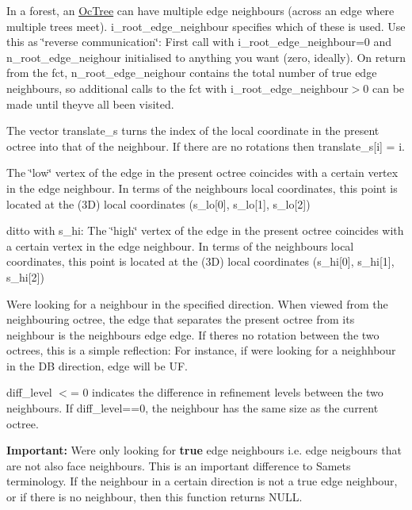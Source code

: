 \begin{DoxyItemize}
\item In a forest, an \hyperlink{classoomph_1_1OcTree}{Oc\+Tree} can have multiple edge neighbours (across an edge where multiple trees meet). {\ttfamily i\+\_\+root\+\_\+edge\+\_\+neighbour} specifies which of these is used. Use this as \char`\"{}reverse communication\char`\"{}\+: First call with {\ttfamily i\+\_\+root\+\_\+edge\+\_\+neighbour=0} and {\ttfamily n\+\_\+root\+\_\+edge\+\_\+neighour} initialised to anything you want (zero, ideally). On return from the fct, {\ttfamily n\+\_\+root\+\_\+edge\+\_\+neighour} contains the total number of true edge neighbours, so additional calls to the fct with {\ttfamily i\+\_\+root\+\_\+edge\+\_\+neighbour$>$0} can be made until they\textquotesingle{}ve all been visited.
\item The vector {\ttfamily translate\+\_\+s} turns the index of the local coordinate in the present octree into that of the neighbour. If there are no rotations then {\ttfamily translate\+\_\+s}\mbox{[}i\mbox{]} = i.
\item The \char`\"{}low\char`\"{} vertex of the edge in the present octree coincides with a certain vertex in the edge neighbour. In terms of the neighbour\textquotesingle{}s local coordinates, this point is located at the (3D) local coordinates ({\ttfamily s\+\_\+lo}\mbox{[}0\mbox{]}, {\ttfamily s\+\_\+lo}\mbox{[}1\mbox{]}, {\ttfamily s\+\_\+lo}\mbox{[}2\mbox{]})
\item ditto with s\+\_\+hi\+: The \char`\"{}high\char`\"{} vertex of the edge in the present octree coincides with a certain vertex in the edge neighbour. In terms of the neighbour\textquotesingle{}s local coordinates, this point is located at the (3D) local coordinates ({\ttfamily s\+\_\+hi}\mbox{[}0\mbox{]}, {\ttfamily s\+\_\+hi}\mbox{[}1\mbox{]}, {\ttfamily s\+\_\+hi}\mbox{[}2\mbox{]})
\item We\textquotesingle{}re looking for a neighbour in the specified {\ttfamily direction}. When viewed from the neighbouring octree, the edge that separates the present octree from its neighbour is the neighbour\textquotesingle{}s edge {\ttfamily edge}. If there\textquotesingle{}s no rotation between the two octrees, this is a simple reflection\+: For instance, if we\textquotesingle{}re looking for a neighhbour in the {\ttfamily DB} {\ttfamily direction}, {\ttfamily edge} will be {\ttfamily UF}.
\item {\ttfamily diff\+\_\+level} $<$= 0 indicates the difference in refinement levels between the two neighbours. If {\ttfamily diff\+\_\+level==0}, the neighbour has the same size as the current octree.
\end{DoxyItemize}{\bfseries Important\+:} We\textquotesingle{}re only looking for {\bfseries true} edge neighbours i.\+e. edge neigbours that are not also face neighbours. This is an important difference to Samet\textquotesingle{}s terminology. If the neighbour in a certain direction is not a true edge neighbour, or if there is no neighbour, then this function returns N\+U\+LL. 

